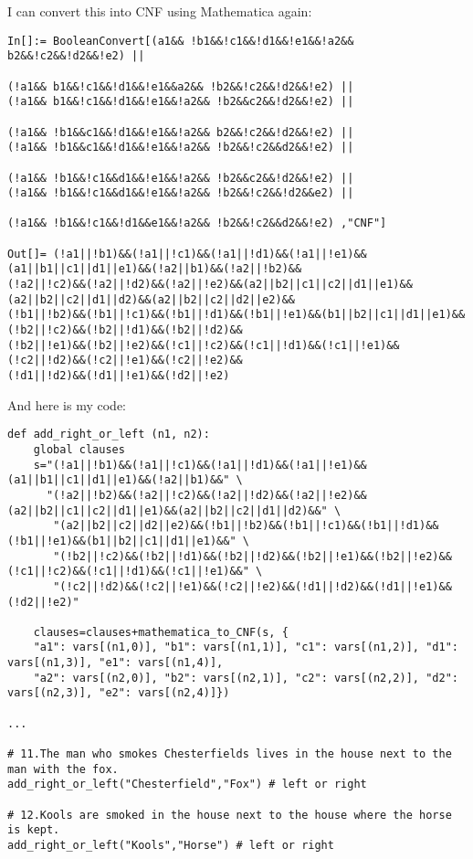 I can convert this into CNF using Mathematica again:

\begin{lstlisting}
In[]:= BooleanConvert[(a1&& !b1&&!c1&&!d1&&!e1&&!a2&& b2&&!c2&&!d2&&!e2) ||

(!a1&& b1&&!c1&&!d1&&!e1&&a2&& !b2&&!c2&&!d2&&!e2) ||
(!a1&& b1&&!c1&&!d1&&!e1&&!a2&& !b2&&c2&&!d2&&!e2) ||

(!a1&& !b1&&c1&&!d1&&!e1&&!a2&& b2&&!c2&&!d2&&!e2) ||
(!a1&& !b1&&c1&&!d1&&!e1&&!a2&& !b2&&!c2&&d2&&!e2) ||

(!a1&& !b1&&!c1&&d1&&!e1&&!a2&& !b2&&c2&&!d2&&!e2) ||
(!a1&& !b1&&!c1&&d1&&!e1&&!a2&& !b2&&!c2&&!d2&&e2) ||

(!a1&& !b1&&!c1&&!d1&&e1&&!a2&& !b2&&!c2&&d2&&!e2) ,"CNF"]

Out[]= (!a1||!b1)&&(!a1||!c1)&&(!a1||!d1)&&(!a1||!e1)&&(a1||b1||c1||d1||e1)&&(!a2||b1)&&(!a2||!b2)&&
(!a2||!c2)&&(!a2||!d2)&&(!a2||!e2)&&(a2||b2||c1||c2||d1||e1)&&(a2||b2||c2||d1||d2)&&(a2||b2||c2||d2||e2)&&
(!b1||!b2)&&(!b1||!c1)&&(!b1||!d1)&&(!b1||!e1)&&(b1||b2||c1||d1||e1)&&(!b2||!c2)&&(!b2||!d1)&&(!b2||!d2)&&
(!b2||!e1)&&(!b2||!e2)&&(!c1||!c2)&&(!c1||!d1)&&(!c1||!e1)&&(!c2||!d2)&&(!c2||!e1)&&(!c2||!e2)&&
(!d1||!d2)&&(!d1||!e1)&&(!d2||!e2)
\end{lstlisting}

And here is my code:

\begin{lstlisting}
def add_right_or_left (n1, n2):
    global clauses
    s="(!a1||!b1)&&(!a1||!c1)&&(!a1||!d1)&&(!a1||!e1)&&(a1||b1||c1||d1||e1)&&(!a2||b1)&&" \
      "(!a2||!b2)&&(!a2||!c2)&&(!a2||!d2)&&(!a2||!e2)&&(a2||b2||c1||c2||d1||e1)&&(a2||b2||c2||d1||d2)&&" \
       "(a2||b2||c2||d2||e2)&&(!b1||!b2)&&(!b1||!c1)&&(!b1||!d1)&&(!b1||!e1)&&(b1||b2||c1||d1||e1)&&" \
       "(!b2||!c2)&&(!b2||!d1)&&(!b2||!d2)&&(!b2||!e1)&&(!b2||!e2)&&(!c1||!c2)&&(!c1||!d1)&&(!c1||!e1)&&" \
       "(!c2||!d2)&&(!c2||!e1)&&(!c2||!e2)&&(!d1||!d2)&&(!d1||!e1)&&(!d2||!e2)"
    
    clauses=clauses+mathematica_to_CNF(s, {
	"a1": vars[(n1,0)], "b1": vars[(n1,1)], "c1": vars[(n1,2)], "d1": vars[(n1,3)], "e1": vars[(n1,4)],
	"a2": vars[(n2,0)], "b2": vars[(n2,1)], "c2": vars[(n2,2)], "d2": vars[(n2,3)], "e2": vars[(n2,4)]})

...

# 11.The man who smokes Chesterfields lives in the house next to the man with the fox.
add_right_or_left("Chesterfield","Fox") # left or right

# 12.Kools are smoked in the house next to the house where the horse is kept.
add_right_or_left("Kools","Horse") # left or right
\end{lstlisting}

